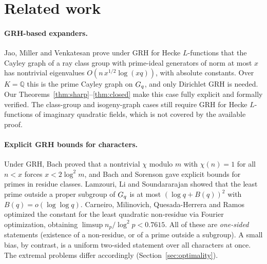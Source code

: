 \section{Related work}\label{sec:related}

\paragraph{GRH-based expanders.}
Jao, Miller and Venkatesan \cite{jmv2009} prove under GRH for Hecke $L$-functions that the Cayley graph of a
ray class group with prime-ideal generators of norm at most $x$ has nontrivial eigenvalues
$O(n\,x^{1/2}\log(xq))$, with absolute constants. Over $K=\mathbb Q$ this is the prime Cayley graph on
$G_q$, and only Dirichlet GRH is needed. Our Theorems~\ref{thm:sharp}--\ref{thm:closed} make this case
fully explicit and formally verified. The class-group and isogeny-graph cases still require GRH for Hecke
$L$-functions of imaginary quadratic fields, which is not covered by the available proof.

\paragraph{Explicit GRH bounds for characters.}
Under GRH, Bach \cite{bach1990} proved that a nontrivial $\chi$ modulo $m$ with $\chi(n)=1$ for all $n<x$
forces $x<2\log^2m$, and Bach and Sorenson \cite{bachsorenson1996} gave explicit bounds for primes in
residue classes. Lamzouri, Li and Soundararajan \cite{lls2015} showed that the least prime outside a proper
subgroup of $G_q$ is at most $(\log q+B(q))^2$ with $B(q)=o(\log\log q)$. Carneiro, Milinovich,
Quesada-Herrera and Ramos \cite{cmqr2024} optimized the constant for the least quadratic non-residue via
Fourier optimization, obtaining $\limsup n_p/\log^2p<0.7615$. All of these are \emph{one-sided} statements
(existence of a non-residue, or of a prime outside a subgroup). A small bias, by contrast, is a uniform
two-sided statement over all characters at once. The extremal problems differ accordingly
(Section~\ref{sec:optimality}).

